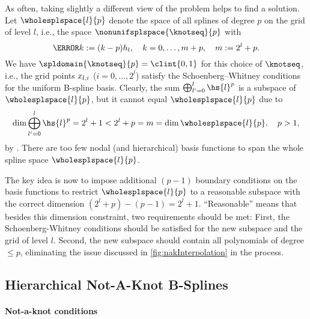 As often, taking slightly a different view of the problem helps
to find a solution.
Let $\wholesplspace{l}{p}$ denote the space of all splines of degree $p$
on the grid of level $l$, i.e., the space $\nonunifsplspace{\knotseq}{p}$ with
\begin{equation}
  \label{eq:fullGridKnots}
  \knot{k} := (k - p) \ms{l},\quad
  k = 0, \dotsc, m + p,\quad
  m := 2^l + p.
\end{equation}
We have $\spldomain{\knotseq}{p} = \clint{0, 1}$ for this choice of $\knotseq$, i.e.,
the grid points $x_{l,i}$ ($i = 0, \dotsc, 2^l$) satisfy
the Schoenberg--Whitney conditions for the uniform B-spline basis.
Clearly, the sum $\bigoplus_{l'=0}^l \hs{l}^p$ is a subspace of $\wholesplspace{l}{p}$,
but it cannot equal $\wholesplspace{l}{p}$ due to
\begin{equation}
  \dim \bigoplus_{l'=0}^l \hs{l}^p
  = 2^l + 1
  < 2^l + p
  = m
  = \dim \wholesplspace{l}{p},\quad
  p > 1,
\end{equation}
by .
There are too few nodal (and hierarchical) basis functions to
span the whole spline space $\wholesplspace{l}{p}$.

The key idea is now to impose additional $(p - 1)$ boundary conditions
on the basis functions to restrict $\wholesplspace{l}{p}$ to a reasonable subspace
with the correct dimension $(2^l + p) - (p - 1) = 2^l + 1$.
``Reasonable'' means that besides this dimension constraint,
two requirements should be met:
First, the Schoenberg-Whitney conditions should be satisfied for
the new subspace and the grid of level $l$.
Second, the new subspace should contain all polynomials of degree $\le p$,
eliminating the issue discussed in \cref{fig:nakInterpolation}
in the process.



\subsection{Hierarchical Not-A-Knot B-Splines}
\label{sec:322NAKBSplines}

\paragraph{Not-a-knot conditions}

